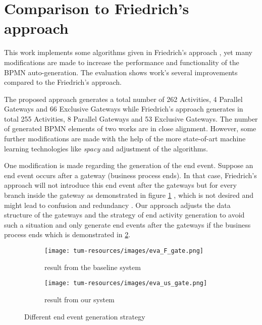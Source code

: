 \section{Comparison to Friedrich's approach}
This work implements some algorithms given in Friedrich's approach \cite{t2m_1_main}, yet many modifications are made to increase the performance and functionality of the BPMN auto-generation. The evaluation shows work's several improvements compared to the Friedrich's approach.

The proposed approach generates a total number of 262 Activities, 4 Parallel Gateways and 66 Exclusive Gateways while Friedrich's approach generates in total 255 Activities, 8 Parallel Gateways and 53 Exclusive Gateways. The number of generated BPMN elements of two works are in close alignment. However, some further modifications are made with the help of the more state-of-art machine learning technologies like \textit{spacy} and adjustment of the algorithms.

One modification is made regarding the generation of the end event. Suppose an end event occurs after a gateway (business process ends). In that case, Friedrich's approach will not introduce this end event after the gateways but for every branch inside the gateway as demonstrated in figure \ref{img:end_event_gen:left} , which is not desired and might lead to confusion and redundancy \cite{BPMN_tech_report}. Our approach adjusts the data structure of the gateways and the strategy of end activity generation to avoid such a situation and only generate end events after the gateways if the business process ends which is demonstrated in \ref{img:end_event_gen:right}. 


\begin{figure}
     \centering
     \begin{subfigure}[b]{0.4\textwidth}
         \centering
         \texttt{[image: tum-resources/images/eva\_F\_gate.png]}
         \caption{result from the baseline system}
         \label{img:end_event_gen:left}
     \end{subfigure}
     \hfill
     \begin{subfigure}[b]{0.5\textwidth}
         \centering
         \texttt{[image: tum-resources/images/eva\_us\_gate.png]}
         \caption{result from our system}
         \label{img:end_event_gen:right}
     \end{subfigure}
     \hfill
     \caption{Different end event generation strategy}
     \label{img:end_event_gen}
\end{figure}

